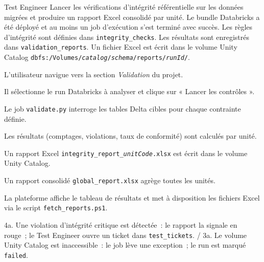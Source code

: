 %
{Test Engineer}%
{Lancer les vérifications d'intégrité référentielle sur les données migrées et produire un rapport Excel consolidé par unité.}%
{Le bundle Databricks a été déployé et au moins un job d'exécution s'est terminé avec succès. Les règles d'intégrité sont définies dans \texttt{integrity\_checks}.}%
{Les résultats sont enregistrés dans \texttt{validation\_reports}. Un fichier Excel est écrit dans le volume Unity Catalog \texttt{dbfs:/Volumes/\textit{catalog}/\textit{schema}/reports/\textit{runId}/}.}%
{%
\item L'utilisateur navigue vers la section \textit{Validation} du projet.
\item Il sélectionne le run Databricks à analyser et clique sur « Lancer les contrôles ».
\item Le job \texttt{validate.py} interroge les tables Delta cibles pour chaque contrainte définie.
\item Les résultats (comptages, violations, taux de conformité) sont calculés par unité.
\item Un rapport Excel \texttt{integrity\_report\_\textit{unitCode}.xlsx} est écrit dans le volume Unity Catalog.
\item Un rapport consolidé \texttt{global\_report.xlsx} agrège toutes les unités.
\item La plateforme affiche le tableau de résultats et met à disposition les fichiers Excel via le script \texttt{fetch\_reports.ps1}.
}%
{4a. Une violation d'intégrité critique est détectée~: le rapport la signale en rouge~; le Test Engineer ouvre un ticket dans \texttt{test\_tickets}. / 3a. Le volume Unity Catalog est inaccessible~: le job lève une exception~; le run est marqué \texttt{failed}.}

